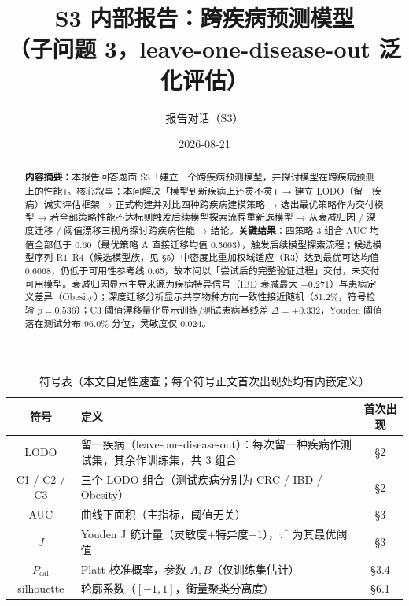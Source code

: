 \documentclass{internal-report}
\title{S3 内部报告：跨疾病预测模型\\（子问题 3，leave-one-disease-out 泛化评估）}
\author{报告对话（S3）}
\date{2026-08-21}
\begin{document}
\maketitle

\begin{abstract}
\textbf{内容摘要：}本报告回答题面 S3「建立一个跨疾病预测模型，并探讨模型在跨疾病预测上的性能」。核心叙事：本问解决「模型到新疾病上还灵不灵」→ 建立 LODO（留一疾病）诚实评估框架 → 正式构建并对比四种跨疾病建模策略 → 选出最优策略作为交付模型 → 若全部策略性能不达标则触发后续模型探索流程重新选模型 → 从衰减归因 / 深度迁移 / 阈值漂移三视角探讨跨疾病性能 → 结论。\textbf{关键结果}：四策略 3 组合 AUC 均值全部低于 0.60（最优策略 A 直接迁移均值 0.5603），触发后续模型探索流程；候选模型序列 R1--R4（候选模型族，见 §5）中密度比重加权域适应（R3）达到最优可达均值 0.6068，仍低于可用性参考线 0.65，故本问以「尝试后的完整验证过程」交付，未交付可用模型。衰减归因显示主导来源为疾病特异信号（IBD 衰减最大 $-0.271$）与患病定义差异（Obesity）；深度迁移分析显示共享物种方向一致性接近随机（51.2\%，符号检验 $p=0.536$）；C3 阈值漂移量化显示训练/测试患病基线差 $\Delta=+0.332$，Youden 阈值落在测试分布 96.0\% 分位，灵敏度仅 0.024。
\end{abstract}

\begin{table}[ht]
\centering
\caption{符号表（本文自足性速查；每个符号正文首次出现处均有内嵌定义）}
\begin{tabular}{c p{} c}
\toprule
\textbf{符号} & \textbf{定义} & \textbf{首次出现} \\
\midrule
LODO & 留一疾病（leave-one-disease-out）：每次留一种疾病作测试集，其余作训练集，共 3 组合 & §2 \\
C1 / C2 / C3 & 三个 LODO 组合（测试疾病分别为 CRC / IBD / Obesity） & §2 \\
AUC & 曲线下面积（主指标，阈值无关） & §3 \\
$J$ & Youden J 统计量（灵敏度$+$特异度$-1$），$\tau^*$ 为其最优阈值 & §3 \\
$P_{\mathrm{cal}}$ & Platt 校准概率，参数 $A,B$（仅训练集估计） & §3.4 \\
silhouette & 轮廓系数（$[-1,1]$，衡量聚类分离度） & §6.1 \\
\bottomrule
\end{tabular}
\end{table}
\end{document}
